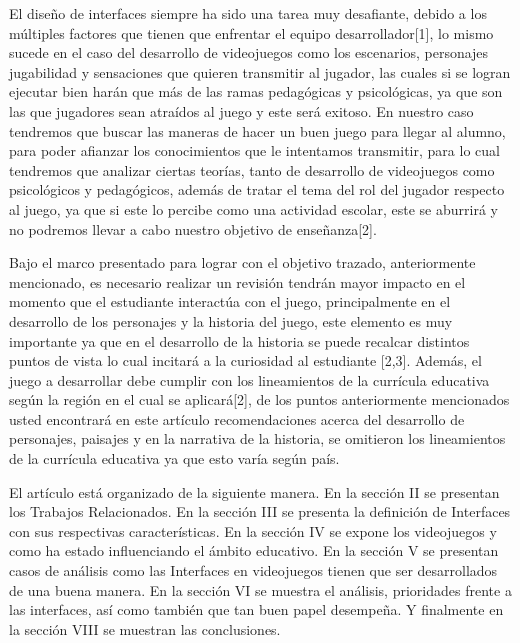 \documentclass[conference, letterpaper]{IEEEtran}
\begin{document}
El diseño de interfaces siempre ha sido una tarea muy desafiante, debido a los múltiples factores que tienen que enfrentar el equipo desarrollador[1], lo mismo sucede en el caso del desarrollo de videojuegos como los escenarios, personajes jugabilidad y sensaciones que quieren transmitir al jugador, las cuales si se logran ejecutar bien harán que más de las ramas pedagógicas y psicológicas, ya que son las que jugadores sean atraídos al juego y este será exitoso. En nuestro caso tendremos que buscar las maneras de hacer un buen juego para llegar al alumno, para poder afianzar los conocimientos que le intentamos transmitir, para lo cual tendremos que analizar ciertas teorías, tanto de desarrollo de videojuegos como psicológicos y pedagógicos, además de tratar el tema del rol del jugador respecto al juego, ya que si este lo percibe como una actividad escolar, este se aburrirá y no podremos llevar a cabo nuestro objetivo de enseñanza[2].

Bajo el marco presentado para lograr con el objetivo trazado, anteriormente mencionado, es necesario realizar un revisión  tendrán mayor impacto en el momento que el estudiante interactúa con el juego, principalmente en el desarrollo de los personajes y la historia del juego, este elemento es muy importante ya que en el desarrollo de la historia se puede recalcar distintos puntos de vista lo cual incitará a la curiosidad al estudiante [2,3]. Además, el juego a desarrollar debe cumplir con los lineamientos de la currícula educativa según la región en el cual se aplicará[2], de los puntos anteriormente mencionados usted encontrará en este artículo recomendaciones acerca del desarrollo de personajes, paisajes y en la narrativa de la historia, se omitieron los lineamientos de la currícula educativa ya que esto varía según país. 

El artículo está organizado de la siguiente manera. En la sección II se presentan los Trabajos Relacionados. En la sección III se presenta la definición de Interfaces con sus respectivas características. En la sección IV se expone los videojuegos y como ha estado influenciando el ámbito educativo. En la sección V se presentan casos de análisis como las Interfaces en videojuegos tienen que ser desarrollados de una buena manera. En la sección VI se muestra el análisis, prioridades frente a las interfaces, así como también que tan buen papel desempeña. Y finalmente en la sección VIII se muestran las conclusiones.
\end{document}
